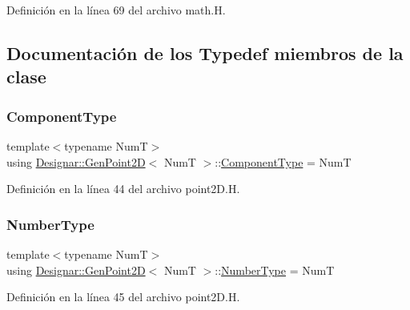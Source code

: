 Definición en la línea 69 del archivo math.\+H.



\subsection{Documentación de los \textquotesingle{}Typedef\textquotesingle{} miembros de la clase}
\mbox{\label{class_designar_1_1_gen_point2_d_a8d80993f38dab83a39e80a50db08b944}} 
\subsubsection{\texorpdfstring{Component\+Type}{ComponentType}}
{\footnotesize\ttfamily template$<$typename NumT$>$ \\
using \hyperlink{class_designar_1_1_gen_point2_d}{Designar\+::\+Gen\+Point2D}$<$ NumT $>$\+::\hyperlink{class_designar_1_1_gen_point2_d_a8d80993f38dab83a39e80a50db08b944}{Component\+Type} =  NumT}



Definición en la línea 44 del archivo point2\+D.\+H.

\mbox{\label{class_designar_1_1_gen_point2_d_a6ad786447c17adc8cbaece7f12ac2132}} 
\subsubsection{\texorpdfstring{Number\+Type}{NumberType}}
{\footnotesize\ttfamily template$<$typename NumT$>$ \\
using \hyperlink{class_designar_1_1_gen_point2_d}{Designar\+::\+Gen\+Point2D}$<$ NumT $>$\+::\hyperlink{class_designar_1_1_gen_point2_d_a6ad786447c17adc8cbaece7f12ac2132}{Number\+Type} =  NumT}



Definición en la línea 45 del archivo point2\+D.\+H.

\mbox{\label{class_designar_1_1_gen_point2_d_a8f13f44ca3438223d1ecdce2728b9437}} 
